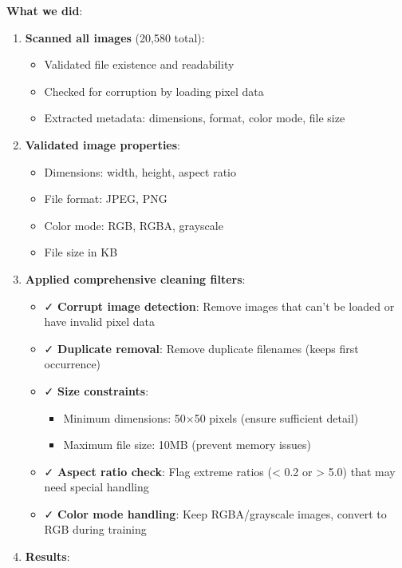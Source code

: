 \documentclass[
  letterpaper,
  DIV=11,
  numbers=noendperiod]{scrartcl}
\providecommand{\tightlist}{%
  \setlength{\itemsep}{0pt}\setlength{\parskip}{0pt}}
\begin{document}
\textbf{What we did}:

\begin{enumerate}
\def\labelenumi{\arabic{enumi}.}
\tightlist
\item
  \textbf{Scanned all images} (20,580 total):

  \begin{itemize}
  \tightlist
  \item
    Validated file existence and readability
  \item
    Checked for corruption by loading pixel data
  \item
    Extracted metadata: dimensions, format, color mode, file size
  \end{itemize}
\item
  \textbf{Validated image properties}:

  \begin{itemize}
  \tightlist
  \item
    Dimensions: width, height, aspect ratio
  \item
    File format: JPEG, PNG
  \item
    Color mode: RGB, RGBA, grayscale
  \item
    File size in KB
  \end{itemize}
\item
  \textbf{Applied comprehensive cleaning filters}:

  \begin{itemize}
  \tightlist
  \item
    ✓ \textbf{Corrupt image detection}: Remove images that can't be
    loaded or have invalid pixel data
  \item
    ✓ \textbf{Duplicate removal}: Remove duplicate filenames (keeps
    first occurrence)
  \item
    ✓ \textbf{Size constraints}:

    \begin{itemize}
    \tightlist
    \item
      Minimum dimensions: 50×50 pixels (ensure sufficient detail)
    \item
      Maximum file size: 10MB (prevent memory issues)
    \end{itemize}
  \item
    ✓ \textbf{Aspect ratio check}: Flag extreme ratios (\textless{} 0.2
    or \textgreater{} 5.0) that may need special handling
  \item
    ✓ \textbf{Color mode handling}: Keep RGBA/grayscale images, convert
    to RGB during training
  \end{itemize}
\item
  \textbf{Results}:


\end{enumerate}
\end{document}
